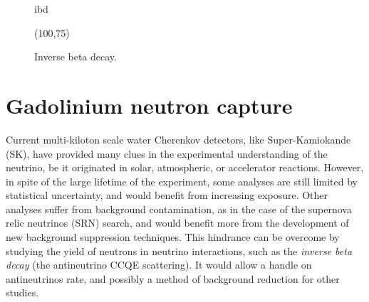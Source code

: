 %

\begin{figure}
	\centering
	\begin{fmffile}{ibd}
		\begin{fmfgraph*}(100,75)
			\fmffreeze
			\begin{fmfgroup}
			\end{fmfgroup}
		\end{fmfgraph*}
	\end{fmffile}
	\smallskip
	\caption{Inverse beta decay.}
\end{figure}

\section{Gadolinium neutron capture}
\label{sec:gdcap}

Current multi-kiloton scale water Cherenkov detectors, like Super-Kamiokande (SK), have provided %
many clues in the experimental understanding of the neutrino, be it originated in solar, atmospheric, or %
accelerator reactions.
However, in spite of the large lifetime of the experiment, some analyses are still limited by statistical uncertainty, %
and would benefit from increasing exposure.
Other analyses suffer from background contamination, as in the case of the supernova relic neutrinos (SRN) search, %
and would benefit more from the development of new background suppression techniques.
This hindrance can be overcome by studying the yield of neutrons in neutrino interactions, such as the %
\emph{inverse beta decay} (the antineutrino CCQE scattering).
It would allow a handle on antineutrinos rate, and possibly a method of background reduction for other studies.

